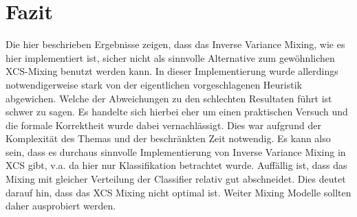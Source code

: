 \documentclass[10pt]{ocsmnar}
\begin{document}
\section{Fazit}
Die hier beschrieben Ergebnisse zeigen, dass das Inverse Variance Mixing, wie es hier implementiert ist, sicher nicht als sinnvolle Alternative zum gewöhnlichen XCS-Mixing benutzt werden kann. In dieser Implementierung wurde allerdings notwendigerweise stark von der eigentlichen vorgeschlagenen Heuristik abgewichen. Welche der Abweichungen zu den schlechten Resultaten führt ist schwer zu sagen. 
Es handelte sich hierbei eher um einen praktischen Versuch und die formale Korrektheit wurde dabei vernachlässigt. Dies war aufgrund der Komplexität des Themas und der beschränkten Zeit notwendig. Es kann also sein, dass es durchaus sinnvolle Implementierung von Inverse Variance Mixing in XCS gibt, v.a. da hier nur Klassifikation betrachtet wurde. 
Auffällig ist, dass das Mixing mit gleicher Verteilung der Classifier relativ gut abschneidet. Dies deutet darauf hin, dass das XCS Mixing nicht optimal ist. Weiter Mixing Modelle sollten daher ausprobiert werden.  





\end{document}
